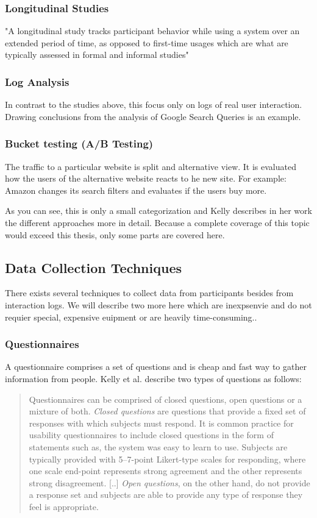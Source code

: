 \documentclass[11pt]{report}
\begin{document}
\subsubsection{Longitudinal Studies}
"A longitudinal study tracks participant behavior while using a system over an extended period of time, as opposed to first-time usages which are what are typically assessed in formal and informal studies"

\subsubsection{Log Analysis}
In contrast to the studies above, this focus only on logs of real user interaction. Drawing conclusions from the analysis of Google Search Queries is an example.

\subsubsection{Bucket testing (A/B Testing)}
The traffic to a particular website is split and alternative view. It is evaluated how the users of the alternative website reacts to he new site. For example: Amazon changes its search filters and evaluates if the users buy more.

As you can see, this is only a small categorization and Kelly describes in her work the different approaches more in detail. Because a complete coverage of this topic would exceed this thesis, only some parts are covered here. 

\subsection{Data Collection Techniques}

There exists several techniques to collect data from participants besides from interaction logs. We will describe two more here which are inexpsenvie and do not requier special, expensive euipment or are heavily time-consuming..

\subsubsection{Questionnaires}

A questionnaire comprises a set of questions and is cheap and fast way to gather information from people. Kelly et al. \cite{Kelly2008} describe two types of questions as follows:

\begin{quote}
	Questionnaires can be comprised of closed questions, open questions or a mixture of both. \textit{Closed questions} are questions that provide a fixed set of responses with which subjects must respond. It is common practice for usability questionnaires to include closed questions in the form of statements such as, the system was easy to learn to use. Subjects are typically provided with 5–7-point Likert-type scales for responding, where one scale end-point represents strong agreement and the other represents strong disagreement. [..] \textit{Open questions}, on the other hand, do not provide a response set and subjects are able to provide any type of response they feel is appropriate. 
	\end{quote}
\end{document}
